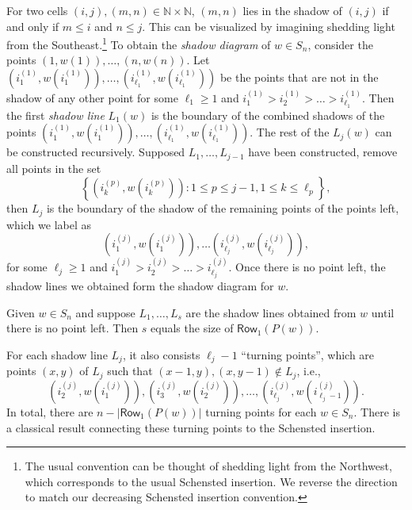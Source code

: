\documentclass[ALCO]{cedram}
\newcommand{\NN}{\mathbb{N}}
\newcommand{\Rowone}[1]
{{\mathsf{{Row}}}_1(P(#1))}
\newcommand{\definition}[1]{{\color{darkred}\emph{#1}}}
\begin{document}
For two cells $(i,j), (m,n) \in \NN\times \NN$, 
$(m,n)$ lies in the shadow of $(i,j)$ if and only if $m \leq i$ and $n \leq j$. This can be visualized by imagining shedding light from the Southeast.\footnote{The usual convention can be thought of shedding light from the Northwest, which corresponds to the usual Schensted insertion. We reverse the direction to match our decreasing Schensted insertion convention.}
To obtain the \definition{shadow diagram} of $w\in S_n$, consider the points $(1,w(1)),\dots, (n,w(n))$. Let $\left(i^{(1)}_1,w(i^{(1)}_1)\right),\dots,\left(i^{(1)}_{\ell_{1}},w(i^{(1)}_{\ell_1})\right)$ be the points that are not in the shadow of any other point for some $\ell_1 \geqslant 1$ and $i^{(1)}_1> i^{(1)}_2>\dots > i^{(1)}_{\ell_1}$. Then the first \definition{shadow line} $L_1(w)$ is the boundary of the combined shadows of the points $\left(i^{(1)}_1,w(i^{(1)}_1)\right),\dots,\left(i^{(1)}_{\ell_1},w(i^{(1)}_{\ell_1})\right)$. The rest of the $L_j(w)$ can be constructed recursively. Supposed $L_1,\dots,L_{j-1}$ have been constructed, remove all points in the set $$\left\{ \left(i^{(p)}_{k},w(i^{(p)}_k)\right): 1\leqslant p \leqslant j-1, 1\leqslant k \leqslant \ell_p \right\},$$ then $L_j$ is the boundary of the shadow of the remaining points of the points left, which we label as 
\[
\left(i^{(j)}_1,w(i^{(j)}_1)\right),\dots \left(i^{(j)}_{\ell_j},w(i^{(j)}_{\ell_j})\right),
\]
for some $\ell_j \geqslant 1$ and $i^{(j)}_1>i^{(j)}_2>\dots>i^{(j)}_{\ell_j}$. Once there is no point left, the shadow lines we obtained form the shadow diagram for $w$.

\begin{ourthm}
Given $w\in S_n$ and suppose $L_1,\dots,L_s$ are the shadow lines obtained from $w$ until there is no point left. Then $s$ equals the size of $\Rowone{w}$.
\end{ourthm}

For each shadow line $L_j$, it also consists $\ell_{j}-1$ ``turning points'', which are points $(x,y)$ of $L_j$ such that $(x-1,y), (x,y-1)\notin L_j$, i.e.,
\[
\left(i^{(j)}_2,w(i^{(j)}_1)\right), \left(i^{(j)}_3,w(i^{(j)}_2)\right), \dots, \left(i^{(j)}_{\ell_j},w(i^{(j)}_{\ell_j-1})\right).
\]
In total, there are $n-|\Rowone{w}|$ turning points for each $w\in S_n$.
There is a classical result connecting
these turning points to the Schensted insertion. 

\end{document}

